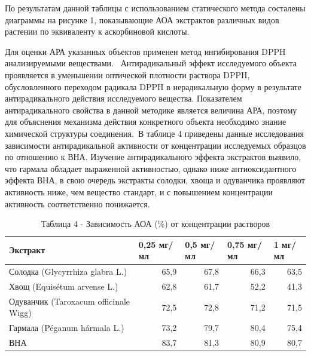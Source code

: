 \begin{multicols}{2}
По результатам данной таблицы с использованием статического метода
состалены диаграммы на рисунке 1, показывающие АОА экстрактов
различных видов растении по эквиваленту к аскорбиновой кислоты.

Для оценки АРА указанных объектов применен метод ингибирования DPPH
анализируемыми веществами.~ Антирадикальный эффект исследуемого объекта
проявляется в уменьшении оптической плотности раствора DPPH,
обусловленного переходом радикала DPPH в нерадикальную форму в
результате антирадикального действия исследуемого вещества. Показателем
антирадикального свойства в данной методике является величина АРА,
поэтому для объяснения механизма действия конкретного объекта необходимо
знание химической структуры соединения.~В таблице 4 приведены данные
исследования зависимости антирадикальной активности от концентрации
исследуемых образцов по отношению к ВНА. Изучение антирадикального
эффекта экстрактов выявило, что гармала обладает выраженной активностью,
однако ниже антиоксидантного эффекта ВНА, в свою очередь экстракты
солодки, хвоща и одуванчика проявляют активность ниже, чем вещество
стандарт, и с повышением концентрации активность соответственно
понижается.
\end{multicols}

\begin{table}[H]
\caption*{Таблица 4 - Зависимость АОА (\%) от концентрации растворов}
\centering
\begin{tabular}{|l|r|r|r|r|}
\hline
Экстракт & \multicolumn{1}{l|}{0,25 мг/мл} & \multicolumn{1}{l|}{0,5 мг/мл} & \multicolumn{1}{l|}{0,75 мг/мл} & \multicolumn{1}{l|}{1 мг/мл} \\ \hline
Солодка (Glycyrrhiza glabra L.)       & 65,9 & 67,8 & 66,3 & 63,5 \\ \hline
Хвощ (Equisétum arvense L.)           & 62,8 & 61,7 & 52,2 & 41,3 \\ \hline
Одуванчик (Taroxacum officinale Wigg) & 72,5 & 72,8 & 71,2 & 71,5 \\ \hline
Гармала (Péganum hármala L.)          & 73,2 & 79,7 & 80,4 & 75,4 \\ \hline
ВНА                                   & 83,7 & 81,3 & 80,9 & 80,7 \\ \hline
\end{tabular}
\end{table}

